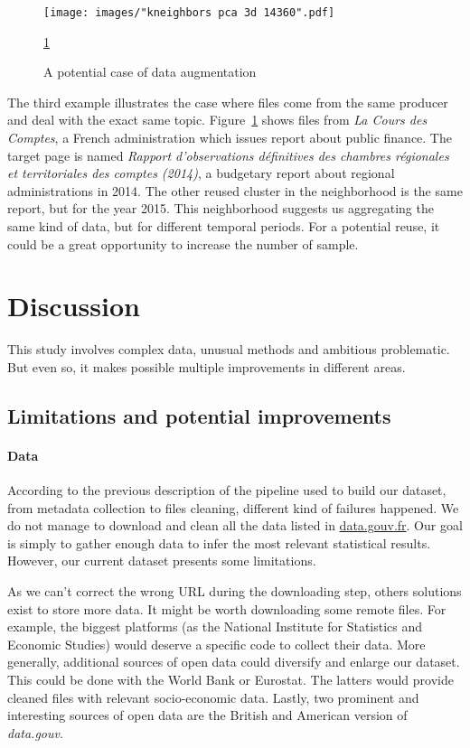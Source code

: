 \documentclass[a4paper]{article}
\begin{document}
	\begin{figure}[]
		\texttt{[image: images/"kneighbors pca 3d 14360".pdf]}
		\caption{A potential case of data augmentation}
		\label{fig:pca compte}
		\ref{fig:pca compte}
	\end{figure}

	The third example illustrates the case where files come from the same producer and deal with the exact same topic. Figure~\ref{fig:pca compte} shows files from \emph{La Cours des Comptes}, a French administration which issues report about public finance. The target page is named \emph{Rapport d'observations définitives des chambres régionales et territoriales des comptes (2014)}, a budgetary report about regional administrations in 2014. The other reused cluster in the neighborhood is the same report, but for the year 2015. This neighborhood suggests us aggregating the same kind of data, but for different temporal periods. For a potential reuse, it could be a great opportunity to increase the number of sample. 
	
	\section{Discussion}
	
	This study involves complex data, unusual methods and ambitious problematic. But even so, it makes possible multiple improvements in different areas.
	
	\subsection{Limitations and potential improvements}
	
	\paragraph{Data}
	
	According to the previous description of the pipeline used to build our dataset, from metadata collection to files cleaning, different kind of failures happened. We do not manage to download and clean all the data listed in \href{http://www.data.gouv.fr/fr/}{data.gouv.fr}. Our goal is simply to gather enough data to infer the most relevant statistical results. However, our current dataset presents some limitations. 
	
	As we can't correct the wrong URL during the downloading step, others solutions exist to store more data. It might be worth downloading some remote files. For example, the biggest platforms (as the National Institute for Statistics and Economic Studies) would deserve a specific code to collect their data. More generally, additional sources of open data could diversify and enlarge our dataset. This could be done with the World Bank or Eurostat. The latters would provide cleaned files with relevant socio-economic data. Lastly, two prominent and interesting sources of open data are the British and American version of \emph{data.gouv}.
	
\end{document}
